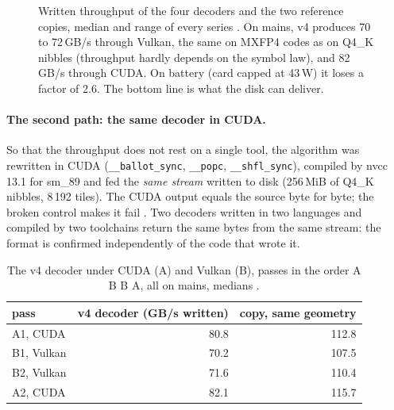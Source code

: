 \begin{figure}[ht]
\centering
\GrapheDebitsDecodeur
\caption[Throughput of the rANS decoders on the RTX 4060 Laptop]{Written throughput of the four decoders and the two reference copies, median and range of every series \mes. On mains, v4 produces 70 to 72\,GB/s through Vulkan, the same on MXFP4 codes as on Q4\_K nibbles (throughput hardly depends on the symbol law), and 82\,GB/s through CUDA. On battery (card capped at 43\,W) it loses a factor of 2.6. The bottom line is what the disk can deliver.}
\label{fig:ent-debits}
\end{figure}

\paragraph{The second path: the same decoder in CUDA.} So that the throughput does not rest on a single tool, the algorithm was rewritten in CUDA (\texttt{\_\_ballot\_sync}, \texttt{\_\_popc}, \texttt{\_\_shfl\_sync}), compiled by nvcc 13.1 for sm\_89 and fed the \emph{same stream} written to disk (256\,MiB of Q4\_K nibbles, 8\,192 tiles). The CUDA output equals the source byte for byte; the broken control makes it fail \mes. Two decoders written in two languages and compiled by two toolchains return the same bytes from the same stream: the format is confirmed independently of the code that wrote it.

\begin{table}[ht]
\centering\small
\caption[The v4 decoder under CUDA and Vulkan, ABBA]{The v4 decoder under CUDA (A) and Vulkan (B), passes in the order A B B A, all on mains, medians \mes.}
\label{tab:ent-abba}
\begin{tabular}{@{}lrr@{}}
\toprule
pass & v4 decoder (GB/s written) & copy, same geometry \\
\midrule
A1, CUDA & 80.8 & 112.8 \\
B1, Vulkan & 70.2 & 107.5 \\
B2, Vulkan & 71.6 & 110.4 \\
A2, CUDA & 82.1 & 115.7 \\
\bottomrule
\end{tabular}
\end{table}

